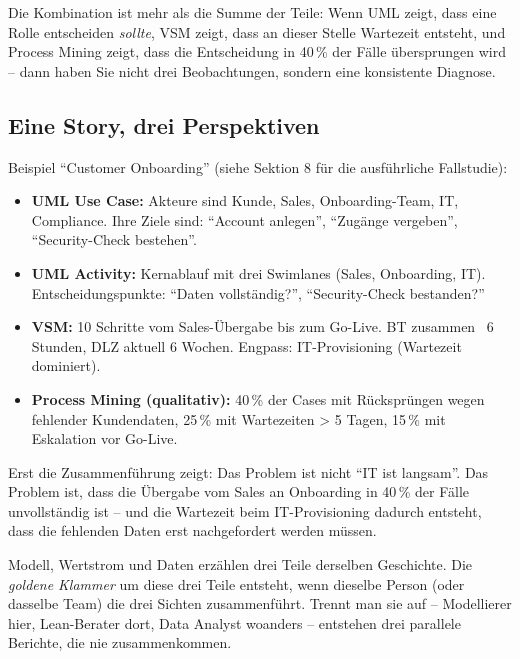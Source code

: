 \documentclass[11pt,a4paper,oneside]{article}
\begin{document}
\medskip

\noindent Die Kombination ist mehr als die Summe der Teile: Wenn UML zeigt, dass eine Rolle entscheiden \emph{sollte}, VSM zeigt, dass an dieser Stelle Wartezeit ent\-steht, und Process Mining zeigt, dass die Entscheidung in 40\,\% der Fälle übersprungen wird -- dann haben Sie nicht drei Beobachtungen, sondern eine konsistente Diagnose.

\subsection{Eine Story, drei Perspektiven}

Beispiel ``Customer Onboarding'' (siehe Sektion 8 für die ausführliche Fallstudie):

\begin{itemize}
  \item \textbf{UML Use Case:} Akteure sind Kunde, Sales, Onboarding-Team, IT, Compliance. Ihre Ziele sind: ``Account anlegen'', ``Zugänge vergeben'', ``Security-Check bestehen''.
  \item \textbf{UML Activity:} Kernablauf mit drei Swimlanes (Sales, Onboarding, IT). Entscheidungspunkte: ``Daten vollständig?'', ``Security-Check bestanden?''
  \item \textbf{VSM:} 10 Schritte vom Sales-Übergabe bis zum Go-Live. BT zusammen ~6 Stunden, DLZ aktuell 6 Wochen. Engpass: IT-Provisioning (Wartezeit dominiert).
  \item \textbf{Process Mining (qualitativ):} 40\,\% der Cases mit Rücksprüngen wegen fehlender Kundendaten, 25\,\% mit Wartezeiten \textgreater{} 5 Tagen, 15\,\% mit Eskalation vor Go-Live.
\end{itemize}

Erst die Zusammenführung zeigt: Das Problem ist nicht ``IT ist langsam''. Das Problem ist, dass die Übergabe vom Sales an Onboarding in 40\,\% der Fälle unvollständig ist -- und die Wartezeit beim IT-Provisioning dadurch entsteht, dass die fehlenden Daten erst nachgefordert werden müssen.

\begin{merkbox}
Modell, Wertstrom und Daten erzählen drei Teile derselben Geschichte. Die \emph{goldene Klammer} um diese drei Teile entsteht, wenn dieselbe Person (oder dasselbe Team) die drei Sichten zusammenführt. Trennt man sie auf -- Modellierer hier, Lean-Berater dort, Data Analyst woanders -- entstehen drei parallele Berichte, die nie zusammenkommen.
\end{merkbox}
\end{document}

